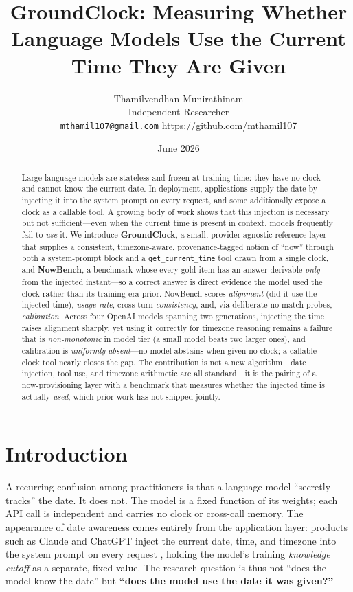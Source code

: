 \documentclass[11pt]{article}
\title{GroundClock: Measuring Whether Language Models Use the Current Time They Are Given}
\author{Thamilvendhan Munirathinam\\ Independent Researcher\\
\texttt{mthamil107@gmail.com} \quad \url{https://github.com/mthamil107}}
\date{June 2026}
\begin{document}
\maketitle

\begin{abstract}
Large language models are stateless and frozen at training time: they have no clock and cannot
know the current date. In deployment, applications supply the date by injecting it into the
system prompt on every request, and some additionally expose a clock as a callable tool. A growing
body of work shows that this injection is necessary but not sufficient---even when the current time
is present in context, models frequently fail to \emph{use} it. We introduce \textbf{GroundClock},
a small, provider-agnostic reference layer that supplies a consistent, timezone-aware,
provenance-tagged notion of ``now'' through both a system-prompt block and a \texttt{get\_current\_time}
tool drawn from a single clock, and \textbf{NowBench}, a benchmark whose every gold item has an
answer derivable \emph{only} from the injected instant---so a correct answer is direct evidence the
model used the clock rather than its training-era prior. NowBench scores \emph{alignment} (did it
use the injected time), \emph{usage rate}, cross-turn \emph{consistency}, and, via deliberate
no-match probes, \emph{calibration}. Across four OpenAI models spanning two generations, injecting
the time raises alignment sharply, yet using it correctly for timezone reasoning remains a failure
that is \emph{non-monotonic} in model tier (a small model beats two larger ones), and calibration is
\emph{uniformly absent}---no model abstains when given no clock; a callable clock tool nearly closes
the gap. The contribution is not a new algorithm---date injection, tool
use, and timezone arithmetic are all standard---it is the pairing of a now-provisioning layer with a
benchmark that measures whether the injected time is actually \emph{used}, which prior work has not
shipped jointly.
\end{abstract}

\section{Introduction}
A recurring confusion among practitioners is that a language model ``secretly tracks'' the date. It
does not. The model is a fixed function of its weights; each API call is independent and carries no
clock or cross-call memory. The appearance of date awareness comes entirely from the application
layer: products such as Claude and ChatGPT inject the current date, time, and timezone into the
system prompt on every request \cite{anthropic_sysprompt,gpt55leak,willison_claude4}, holding the
model's training \emph{knowledge cutoff} as a separate, fixed value. The research question is thus
not ``does the model know the date'' but \textbf{``does the model use the date it was given?''}
\end{document}

